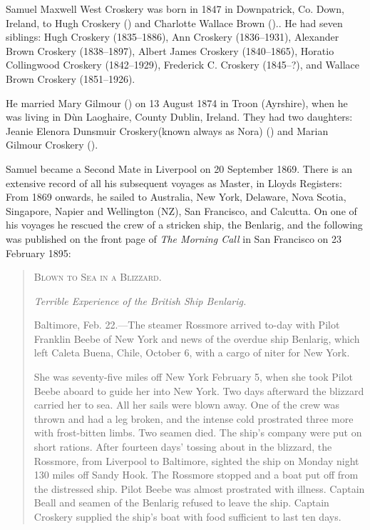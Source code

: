 
Samuel Maxwell West Croskery was born in 1847 in Downpatrick, Co. Down, Ireland, to Hugh Croskery () and Charlotte Wallace Brown ().\cite{SMWC-MG-marriage}. He had seven siblings: Hugh Croskery (1835--1886), Ann Croskery (1836--1931), Alexander Brown Croskery (1838--1897), Albert James Croskery (1840--1865), Horatio Collingwood Croskery (1842--1929), Frederick C. Croskery (1845--?), and Wallace Brown Croskery (1851--1926).

He married Mary Gilmour () on 13 August 1874 in Troon (Ayrshire), when he was living in D\`{u}n Laoghaire, County Dublin, Ireland.\cite{SMWC-MG-marriage} They had two daughters: Jeanie Elenora Dunsmuir Croskery(known always as Nora) () and Marian Gilmour Croskery ().

Samuel became a Second Mate in Liverpool on 20 September 1869. There is an extensive record of all his subsequent voyages as Master, in Lloyds Registers:\cite{MarineRecordsSMWC} From 1869 onwards, he sailed to Australia, New York, Delaware, Nova Scotia, Singapore, Napier and Wellington (NZ), San Francisco, and Calcutta. On one of his voyages he rescued the crew of a stricken ship, the Benlarig, and the following was published on the front page of \emph{The Morning Call} in San Francisco on 23 February 1895:

\begin{quotation}
\textsc{Blown to Sea in a Blizzard.}

\emph{Terrible Experience of the British Ship Benlarig.}

Baltimore, Feb. 22.---The steamer Rossmore arrived to-day with Pilot Franklin Beebe of New York and news of the overdue ship Benlarig, which left Caleta Buena, Chile, October 6, with a cargo of niter for New York.

She was seventy-five miles off New York February 5, when she took Pilot Beebe aboard to guide her into New York. Two days afterward the blizzard carried her to sea. All her sails were blown away. One of the crew was thrown and had a leg broken, and the intense cold prostrated three more with frost-bitten limbs. Two seamen died. The ship's company were put on short rations. After fourteen days' tossing about in the blizzard, the Rossmore, from Liverpool to Baltimore, sighted the ship on Monday night 130 miles off Sandy Hook. The Rossmore stopped and a boat put off from the distressed ship. Pilot Beebe was almost prostrated with illness. Captain Beall and seamen of the Benlarig refused to leave the ship. Captain Croskery supplied the ship's boat with food sufficient to last ten days. 
\end{quotation}

